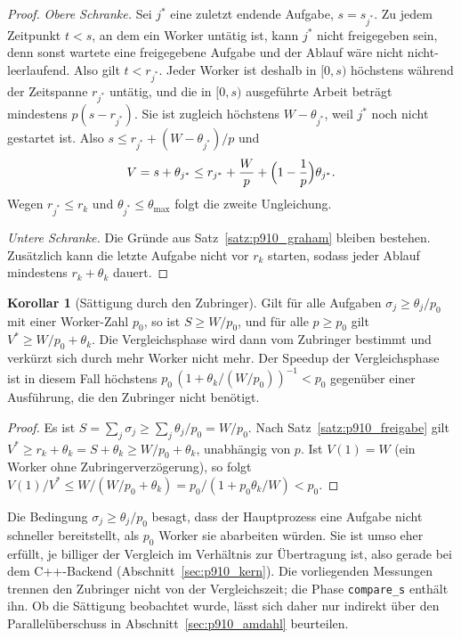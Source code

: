 \documentclass[a4paper,12pt, twoside]{report}
\theoremstyle{definition}
\newtheorem{korollar}{Korollar}
\begin{document}
\begin{proof}
\emph{Obere Schranke.} Sei $j^\ast$ eine zuletzt endende Aufgabe, $s=s_{j^\ast}$. Zu jedem Zeitpunkt $t<s$, an dem ein Worker untätig ist, kann $j^\ast$ nicht freigegeben sein, denn sonst wartete eine freigegebene Aufgabe und der Ablauf wäre nicht nicht-leerlaufend. Also gilt $t<r_{j^\ast}$. Jeder Worker ist deshalb in $[0,s)$ höchstens während der Zeitspanne $r_{j^\ast}$ untätig, und die in $[0,s)$ ausgeführte Arbeit beträgt mindestens $p(s-r_{j^\ast})$. Sie ist zugleich höchstens $W-\theta_{j^\ast}$, weil $j^\ast$ noch nicht gestartet ist. Also $s\le r_{j^\ast}+(W-\theta_{j^\ast})/p$ und
\[
V=s+\theta_{j^\ast}\le r_{j^\ast}+\frac Wp+\Bigl(1-\frac1p\Bigr)\theta_{j^\ast}.
\]
Wegen $r_{j^\ast}\le r_k$ und $\theta_{j^\ast}\le\theta_{\max}$ folgt die zweite Ungleichung.

\emph{Untere Schranke.} Die Gründe aus Satz~\ref{satz:p910_graham} bleiben bestehen. Zusätzlich kann die letzte Aufgabe nicht vor $r_k$ starten, sodass jeder Ablauf mindestens $r_k+\theta_k$ dauert.
\end{proof}

\begin{korollar}[Sättigung durch den Zubringer]
\label{kor:p910_saettigung}
Gilt für alle Aufgaben $\sigma_j\ge\theta_j/p_0$ mit einer Worker-Zahl $p_0$, so ist $S\ge W/p_0$, und für alle $p\ge p_0$ gilt $V^\ast\ge W/p_0+\theta_k$. Die Vergleichsphase wird dann vom Zubringer bestimmt und verkürzt sich durch mehr Worker nicht mehr. Der Speedup der Vergleichsphase ist in diesem Fall höchstens $p_0\,(1+\theta_k/(W/p_0))^{-1}<p_0$ gegenüber einer Ausführung, die den Zubringer nicht benötigt.
\end{korollar}

\begin{proof}
Es ist $S=\sum_j\sigma_j\ge\sum_j\theta_j/p_0=W/p_0$. Nach Satz~\ref{satz:p910_freigabe} gilt $V^\ast\ge r_k+\theta_k=S+\theta_k\ge W/p_0+\theta_k$, unabhängig von $p$. Ist $V(1)=W$ (ein Worker ohne Zubringerverzögerung), so folgt $V(1)/V^\ast\le W/(W/p_0+\theta_k)=p_0/(1+p_0\theta_k/W)<p_0$.
\end{proof}

Die Bedingung $\sigma_j\ge\theta_j/p_0$ besagt, dass der Hauptprozess eine Aufgabe nicht schneller bereitstellt, als $p_0$ Worker sie abarbeiten würden. Sie ist umso eher erfüllt, je billiger der Vergleich im Verhältnis zur Übertragung ist, also gerade bei dem C++-Backend (Abschnitt~\ref{sec:p910_kern}). Die vorliegenden Messungen trennen den Zubringer nicht von der Vergleichszeit; die Phase \texttt{compare\_s} enthält ihn. Ob die Sättigung beobachtet wurde, lässt sich daher nur indirekt über den Parallelüberschuss in Abschnitt~\ref{sec:p910_amdahl} beurteilen.
\end{document}
